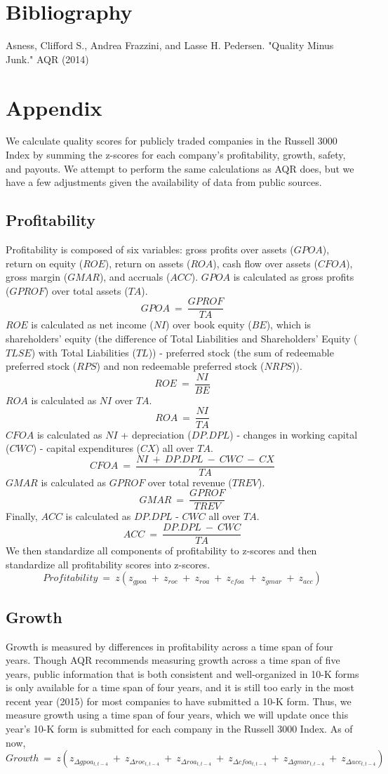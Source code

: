 \documentclass[12pt]{article}
\begin{document}
\section*{Bibliography}
Asness, Clifford S., Andrea Frazzini, and Lasse H. Pedersen. "Quality Minus Junk." AQR (2014)
\section*{Appendix}
We calculate quality scores for publicly traded companies in the Russell 3000 Index by summing the z-scores for each company's profitability, growth, safety, and payouts. We attempt to perform the same calculations as AQR does, but we have a few adjustments given the availability of data from public sources. 
\subsection*{Profitability}
Profitability is composed of six variables: gross profits over assets ($GPOA$), return on equity ($ROE$), return on assets ($ROA$), cash flow over assets ($CFOA$), gross margin ($GMAR$), and accruals ($ACC$). $GPOA$ is calculated as gross profits ($GPROF$) over total assets ($TA$). $$GPOA \ = \ \frac{GPROF}{TA}$$ $ROE$ is calculated as net income ($NI$) over book equity ($BE$), which is shareholders' equity (the difference of Total Liabilities and Shareholders' Equity ($TLSE$) with Total Liabilities ($TL$)) - preferred stock (the sum of redeemable preferred stock ($RPS$) and non redeemable preferred stock ($NRPS$)). $$ROE \ = \ \frac{NI}{BE}$$ $ROA$ is calculated as $NI$ over $TA$. $$ROA \ = \ \frac{NI}{TA}$$ $CFOA$ is calculated as $NI$ + depreciation ($DP.DPL$) - changes in working capital ($CWC$) - capital expenditures ($CX$) all over $TA$. $$CFOA \ = \ \frac{NI \ + \ DP.DPL \ - \ CWC \ - \ CX}{TA}$$ $GMAR$ is calculated as $GPROF$ over total revenue ($TREV$). $$GMAR \ = \ \frac{GPROF}{TREV}$$ Finally, $ACC$ is calculated as $DP.DPL$ - $CWC$ all over $TA$. $$ACC \ = \ \frac{DP.DPL \ - \ CWC}{TA}$$ We then standardize all components of profitability to z-scores and then standardize all profitability scores into z-scores. $$Profitability \ = \ z(z_{gpoa} \ + \ z_{roe} \ + \ z_{roa} \ + \ z_{cfoa} \ + \ z_{gmar} \ + \ z_{acc})$$
\subsection*{Growth}
Growth is measured by differences in profitability across a time span of four years. Though AQR recommends measuring growth across a time span of five years, public information that is both consistent and well-organized in 10-K forms is only available for a time span of four years, and it is still too early in the most recent year (2015) for most companies to have submitted a 10-K form. Thus, we measure growth using a time span of four years, which we will update once this year's 10-K form is submitted for each company in the Russell 3000 Index. As of now, $$Growth \ = \ z(z_{\Delta gpoa_{t,t-4}} \ + \ z_{\Delta roe_{t,t-4}} \ + \ z_{\Delta roa_{t,t-4}} \ + \ z_{\Delta cfoa_{t,t-4}} \ + \ z_{\Delta gmar_{t,t-4}} \ + \ z_{\Delta acc_{t,t-4}})$$
\end{document}
